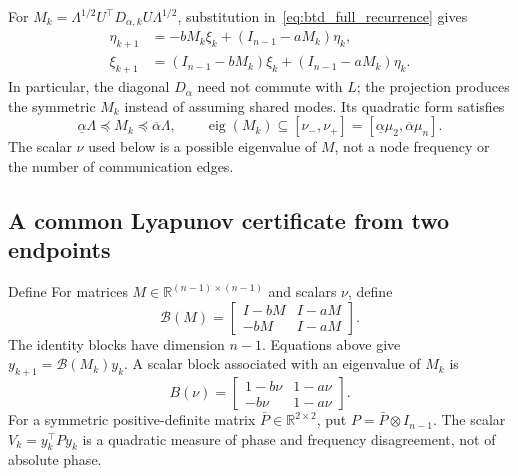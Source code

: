 For $M_k=\Lambda^{1/2}U^\top D_{\alpha,k}U\Lambda^{1/2}$,
substitution in~\eqref{eq:btd_full_recurrence} gives
\begin{align}
 \eta_{k+1}&=-bM_k\xi_k+(I_{n-1}-aM_k)\eta_k,\nonumber\\
 \xi_{k+1}&=(I_{n-1}-bM_k)\xi_k+(I_{n-1}-aM_k)\eta_k.
 \label{eq:btd_d_projected_recurrence}
\end{align}
In particular, the diagonal $D_\alpha$ need not commute with $L$; the
projection produces the symmetric $M_k$ instead of assuming shared modes.
Its quadratic form satisfies
\begin{equation}
 \underline\alpha\Lambda\preceq M_k\preceq\overline\alpha\Lambda,
 \qquad \operatorname{eig}(M_k)\subseteq
 [\nu_-,\nu_+]=[\underline\alpha\mu_2,\overline\alpha\mu_n].
 \label{eq:btd_d_sector_matrix}
\end{equation}
The scalar $\nu$ used below is a possible eigenvalue of $M$, not a node
frequency or the number of communication edges.

\subsection{A common Lyapunov certificate from two endpoints}
\label{subsec:btd_ref_certificate}

Define
For matrices $M\in\mathbb R^{(n-1)\times(n-1)}$ and scalars $\nu$,
define
\begin{equation}
 \mathcal B(M)=\begin{bmatrix}I-bM&I-aM\\-bM&I-aM\end{bmatrix}.
 \label{eq:btd_matrix_dynamics}
\end{equation}
The identity blocks have dimension $n-1$. Equations above give
$y_{k+1}=\mathcal B(M_k)y_k$. A scalar block associated with an eigenvalue
of $M_k$ is
\begin{equation}
 B(\nu)=\begin{bmatrix}1-b\nu&1-a\nu\\-b\nu&1-a\nu\end{bmatrix}.
 \label{eq:btd_scalar_block}
\end{equation}
For a symmetric positive-definite matrix $\bar P\in\mathbb R^{2\times2}$,
put $P=\bar P\otimes I_{n-1}$. The scalar
$V_k=y_k^\top P y_k$ is a quadratic measure of phase and frequency
disagreement, not of absolute phase.

